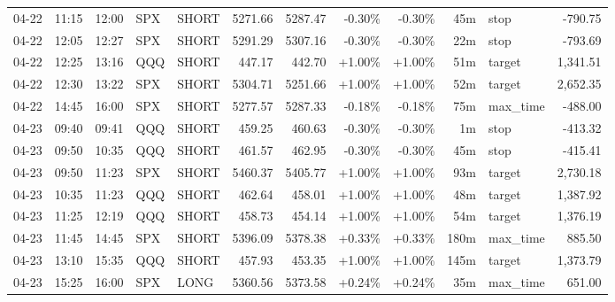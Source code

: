 \documentclass[11pt,a4paper,twoside]{article}
\begin{document}
\begin{center}
\begin{longtable}{>{\color{txtmain}}l l l l l r r r r r >{\color{txtmain}}l r}
04-22 & 11:15 & 12:00 & SPX & SHORT & 5271.66 & 5287.47 & \textcolor{lossred}{-0.30\%} & \textcolor{lossred}{-0.30\%} & 45m & stop & \textcolor{lossred}{-790.75} \\
04-22 & 12:05 & 12:27 & SPX & SHORT & 5291.29 & 5307.16 & \textcolor{lossred}{-0.30\%} & \textcolor{lossred}{-0.30\%} & 22m & stop & \textcolor{lossred}{-793.69} \\
04-22 & 12:25 & 13:16 & QQQ & SHORT & 447.17 & 442.70 & \textcolor{wingreen}{+1.00\%} & \textcolor{wingreen}{+1.00\%} & 51m & target & \textcolor{wingreen}{1,341.51} \\
04-22 & 12:30 & 13:22 & SPX & SHORT & 5304.71 & 5251.66 & \textcolor{wingreen}{+1.00\%} & \textcolor{wingreen}{+1.00\%} & 52m & target & \textcolor{wingreen}{2,652.35} \\
04-22 & 14:45 & 16:00 & SPX & SHORT & 5277.57 & 5287.33 & \textcolor{lossred}{-0.18\%} & \textcolor{lossred}{-0.18\%} & 75m & max\_time & \textcolor{lossred}{-488.00} \\
04-23 & 09:40 & 09:41 & QQQ & SHORT & 459.25 & 460.63 & \textcolor{lossred}{-0.30\%} & \textcolor{lossred}{-0.30\%} & 1m & stop & \textcolor{lossred}{-413.32} \\
04-23 & 09:50 & 10:35 & QQQ & SHORT & 461.57 & 462.95 & \textcolor{lossred}{-0.30\%} & \textcolor{lossred}{-0.30\%} & 45m & stop & \textcolor{lossred}{-415.41} \\
04-23 & 09:50 & 11:23 & SPX & SHORT & 5460.37 & 5405.77 & \textcolor{wingreen}{+1.00\%} & \textcolor{wingreen}{+1.00\%} & 93m & target & \textcolor{wingreen}{2,730.18} \\
04-23 & 10:35 & 11:23 & QQQ & SHORT & 462.64 & 458.01 & \textcolor{wingreen}{+1.00\%} & \textcolor{wingreen}{+1.00\%} & 48m & target & \textcolor{wingreen}{1,387.92} \\
04-23 & 11:25 & 12:19 & QQQ & SHORT & 458.73 & 454.14 & \textcolor{wingreen}{+1.00\%} & \textcolor{wingreen}{+1.00\%} & 54m & target & \textcolor{wingreen}{1,376.19} \\
04-23 & 11:45 & 14:45 & SPX & SHORT & 5396.09 & 5378.38 & \textcolor{wingreen}{+0.33\%} & \textcolor{wingreen}{+0.33\%} & 180m & max\_time & \textcolor{wingreen}{885.50} \\
04-23 & 13:10 & 15:35 & QQQ & SHORT & 457.93 & 453.35 & \textcolor{wingreen}{+1.00\%} & \textcolor{wingreen}{+1.00\%} & 145m & target & \textcolor{wingreen}{1,373.79} \\
04-23 & 15:25 & 16:00 & SPX & LONG & 5360.56 & 5373.58 & \textcolor{wingreen}{+0.24\%} & \textcolor{wingreen}{+0.24\%} & 35m & max\_time & \textcolor{wingreen}{651.00} \\

\end{longtable}
\end{center}
\end{document}
